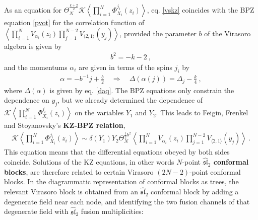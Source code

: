\documentclass[12pt, a4paper, notitlepage, twoside]{report}
\numberwithin{equation}{section}
\theoremstyle{break}
\begin{document}
As an equation for $\Theta_N^{\frac{k+2}{2}}\mathcal{K}\left\langle \prod_{i=1}^N \Phi^{j_i}_{X_i}(z_i)\right\rangle$,
eq. \eqref{vskz} coincides with the BPZ equation \eqref{pvot} for the correlation function of $\left\langle \prod_{i=1}^N V_{\alpha_i}(z_i) \prod_{j=1}^{N-2}V_{\langle 2,1\rangle}(y_j)\right\rangle$, provided the parameter $b$ of the Virasoro algebra is given by 
\begin{align}
 \boxed{ b^2 = -k-2}\ ,
\label{bk}
\end{align}
and the momentums $\alpha_i$ are given in terms of the spins $j_i$ by 
\begin{align}
 \boxed{\alpha = -b^{-1}j+\frac{b}{2}}\quad \Rightarrow \quad \boxed{\Delta(\alpha(j)) = \Delta_j-\frac{k}{4}}\ ,
\label{aj}
\end{align}
where $\Delta(\alpha)$ is given by eq. \eqref{daq}.
The BPZ equations only constrain the dependence on $y_j$, but we already determined the dependence of  
$\mathcal{K}\left\langle \prod_{i=1}^N \Phi^{j_i}_{X_i}(z_i)\right\rangle$ on the variables $Y_1$ and $Y_2$.
This leads to Feigin, Frenkel and Stoyanovsky's \textbf{\boldmath KZ-BPZ relation},
\begin{align}
 \boxed{ \mathcal{K}\left\langle \prod_{i=1}^N \Phi^{j_i}_{X_i}(z_i)\right\rangle \sim \delta(Y_1) Y_2 \Theta_N^{\frac12 b^2} \left\langle \prod_{i=1}^N V_{\alpha_i}(z_i)\prod_{j=1}^{N-2}V_{\langle 2,1\rangle}(y_j)\right\rangle}\ .
\label{dyy}
\end{align}
This equation means that the differential equations obeyed by both sides coincide.
Solutions of the KZ equations, in other words $N$-point \textbf{\boldmath $\widehat{\mathfrak{sl}}_2$ conformal blocks}, are therefore related to certain Virasoro $(2N-2)$-point conformal blocks. 
In the diagrammatic representation of conformal blocks as trees, the relevant Virasoro block is obtained from an $\widehat{\mathfrak{sl}}_2$ conformal block by adding a degenerate field near each node, and identifying the two fusion channels of that degenerate field with $\widehat{\mathfrak{sl}}_2$ fusion multiplicities:
\end{document}
